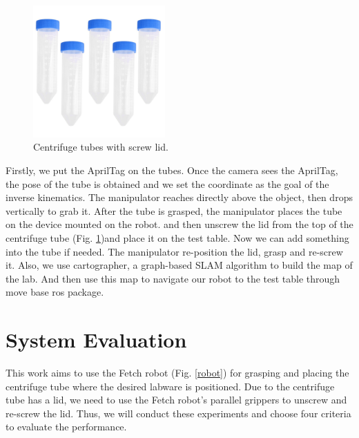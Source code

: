 \documentclass[12pt,draftclsnofoot,onecolumn]{IEEEtran}
\begin{document}
	\begin{figure}[H]
		\centering
		\includegraphics[width=0.45\textwidth]{img/tubes.jpg}
		\caption{
			Centrifuge tubes with screw lid.
		}
		\label{tube}
	\end{figure}
	
	Firstly, we put the AprilTag on the tubes. Once the camera sees the AprilTag, the pose of the tube is obtained and we set the coordinate
	as the goal of the inverse kinematics. The manipulator reaches directly above the object, then drops vertically to grab it. 
	After the tube is grasped, the manipulator places the tube on the device mounted on the robot. 
	and then unscrew the lid from the top of the centrifuge tube (Fig. \ref{tube})and place it on the test table.
	Now we can add something into the tube if needed.
	The manipulator re-position the lid, grasp and re-screw it. 
	Also, we use cartographer, a graph-based SLAM algorithm to build the map of the lab. And then use this map to navigate our robot 
	to the test table through move base ros package.
	
	\section{System Evaluation}
	This work aims to use the Fetch robot (Fig. \ref{robot})  for grasping and placing the centrifuge tube where the desired labware is positioned. Due to the centrifuge tube has a lid, we need to use the Fetch robot's parallel grippers to unscrew and re-screw the lid. Thus, we will conduct these experiments and choose four criteria to evaluate the performance.
	
\end{document}
